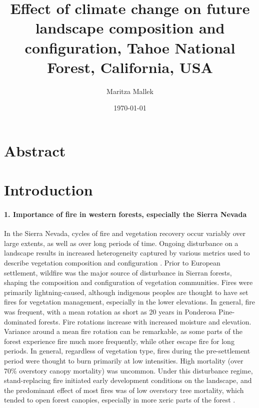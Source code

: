 \documentclass[12pt]{article}
\title{Effect of climate change on future landscape composition and configuration, Tahoe National Forest, California, USA}
\author{ Maritza Mallek }
\date{\today}
\begin{document}
\maketitle
\begin{spacing}{1}


\section*{Abstract}

\section*{Introduction}

\paragraph{1. Importance of fire in western forests, especially the Sierra Nevada}
In the Sierra Nevada, cycles of fire and vegetation recovery occur variably over large extents, as well as over long periods of time. Ongoing disturbance on a landscape results in increased heterogeneity captured by various metrics used to describe vegetation composition and configuration \citep{Monica2008}. Prior to European settlement, wildfire was the major source of disturbance in Sierran forests, shaping the composition and configuration of vegetation communities. Fires were primarily lightning-caused, although indigenous peoples are thought to have set fires for vegetation management, especially in the lower elevations. In general, fire was frequent, with a mean rotation as short as 20 years in Ponderosa Pine-dominated forests. Fire rotations increase with increased moisture and elevation. Variance around a mean fire rotation can be remarkable, as some parts of the forest experience fire much more frequently, while other escape fire for long periods. In general, regardless of vegetation type, fires during the pre-settlement period were thought to burn primarily at low intensities. High mortality (over 70\% overstory canopy mortality) was uncommon. Under this disturbance regime, stand-replacing fire initiated early development conditions on the landscape, and the predominant effect of most fires was of low overstory tree mortality, which tended to open forest canopies, especially in more xeric parts of the forest \citep{Mallek2013,Safford2014,SNEP1996,SNEP1996a}. 


\end{spacing}
\end{document}
